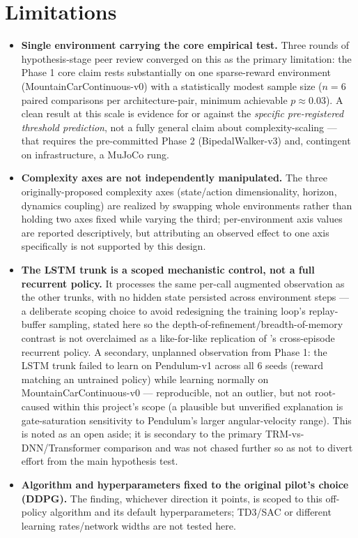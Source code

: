 \documentclass[11pt]{article}
\begin{document}
\section{Limitations}
\label{sec:limitations}

\begin{itemize}
  \item \textbf{Single environment carrying the core empirical test.} Three rounds of hypothesis-stage peer review converged on this as the primary limitation: the Phase 1 core claim rests substantially on one sparse-reward environment (MountainCarContinuous-v0) with a statistically modest sample size ($n=6$ paired comparisons per architecture-pair, minimum achievable $p \approx 0.03$). A clean result at this scale is evidence for or against the \emph{specific pre-registered threshold prediction}, not a fully general claim about complexity-scaling --- that requires the pre-committed Phase 2 (BipedalWalker-v3) and, contingent on infrastructure, a MuJoCo rung.
  \item \textbf{Complexity axes are not independently manipulated.} The three originally-proposed complexity axes (state/action dimensionality, horizon, dynamics coupling) are realized by swapping whole environments rather than holding two axes fixed while varying the third; per-environment axis values are reported descriptively, but attributing an observed effect to one axis specifically is not supported by this design.
  \item \textbf{The LSTM trunk is a scoped mechanistic control, not a full recurrent policy.} It processes the same per-call augmented observation as the other trunks, with no hidden state persisted across environment steps --- a deliberate scoping choice to avoid redesigning the training loop's replay-buffer sampling, stated here so the depth-of-refinement/breadth-of-memory contrast is not overclaimed as a like-for-like replication of \citet{bakker2007recurrent}'s cross-episode recurrent policy. A secondary, unplanned observation from Phase 1: the LSTM trunk failed to learn on Pendulum-v1 across all 6 seeds (reward matching an untrained policy) while learning normally on MountainCarContinuous-v0 --- reproducible, not an outlier, but not root-caused within this project's scope (a plausible but unverified explanation is gate-saturation sensitivity to Pendulum's larger angular-velocity range). This is noted as an open aside; it is secondary to the primary TRM-vs-DNN/Transformer comparison and was not chased further so as not to divert effort from the main hypothesis test.
  \item \textbf{Algorithm and hyperparameters fixed to the original pilot's choice (DDPG).} The finding, whichever direction it points, is scoped to this off-policy algorithm and its default hyperparameters; TD3/SAC or different learning rates/network widths are not tested here.
\end{itemize}
\end{document}
